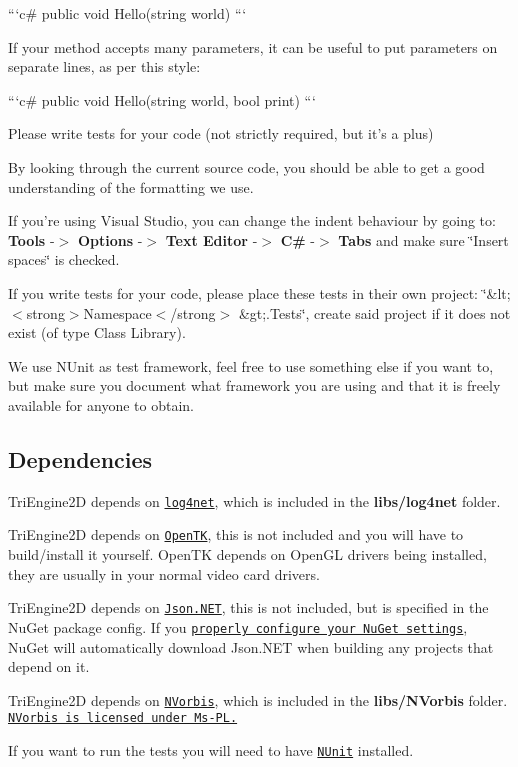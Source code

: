 ```c\# public void Hello(string world) ```


\begin{DoxyItemize}
\item If your method accepts many parameters, it can be useful to put parameters on separate lines, as per this style\-:
\end{DoxyItemize}

```c\# public void Hello(string world, bool print) ```


\begin{DoxyItemize}
\item Please write tests for your code (not strictly required, but it's a plus)
\end{DoxyItemize}

By looking through the current source code, you should be able to get a good understanding of the formatting we use.

If you're using Visual Studio, you can change the indent behaviour by going to\-: {\bfseries Tools} -\/$>$ {\bfseries Options} -\/$>$ {\bfseries Text Editor} -\/$>$ {\bfseries C\#} -\/$>$ {\bfseries Tabs} and make sure \char`\"{}\-Insert spaces\char`\"{} is checked.

If you write tests for your code, please place these tests in their own project\-: \char`\"{}\&lt; $<$strong$>$\-Namespace$<$/strong$>$ \&gt;.\-Tests\char`\"{}, create said project if it does not exist (of type Class Library).

We use N\-Unit as test framework, feel free to use something else if you want to, but make sure you document what framework you are using and that it is freely available for anyone to obtain.

\subsection*{Dependencies}

Tri\-Engine2\-D depends on \href{http://logging.apache.org/log4net/}{\tt log4net}, which is included in the {\bfseries libs/log4net} folder.

Tri\-Engine2\-D depends on \href{http://www.opentk.com/}{\tt Open\-T\-K}, this is not included and you will have to build/install it yourself. Open\-T\-K depends on Open\-G\-L drivers being installed, they are usually in your normal video card drivers.

Tri\-Engine2\-D depends on \href{http://json.codeplex.com/}{\tt Json.\-N\-E\-T}, this is not included, but is specified in the Nu\-Get package config. If you \href{http://docs.nuget.org/docs/workflows/using-nuget-without-committing-packages#Using_NuGet_without_committing_packages_to_source_control}{\tt properly configure your Nu\-Get settings}, Nu\-Get will automatically download Json.\-N\-E\-T when building any projects that depend on it.

Tri\-Engine2\-D depends on \href{http://nvorbis.codeplex.com/}{\tt N\-Vorbis}, which is included in the {\bfseries libs/\-N\-Vorbis} folder. \href{http://nvorbis.codeplex.com/license}{\tt N\-Vorbis is licensed under Ms-\/\-P\-L.}

If you want to run the tests you will need to have \href{http://www.nunit.org/}{\tt N\-Unit} installed. 